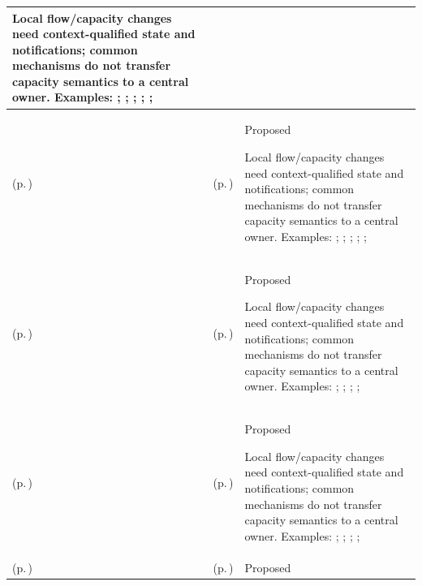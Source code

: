 \begin{longtable}{|>{\raggedright\arraybackslash}p{0.27\TableWidth}|>{\raggedright\arraybackslash}p{0.27\TableWidth}|>{\raggedright\arraybackslash}p{0.46\TableWidth}|}
Local flow/capacity changes need context-qualified state and notifications; common mechanisms do not transfer capacity semantics to a central owner. Examples: \nameref{feature:feat-hso-05}; \nameref{feature:feat-hso-06}; \nameref{function:manage-theatre-capacity}; \nameref{function:manage-theatre-case-progression}; \nameref{service:theatre-case-progression-telemetry}; \nameref{feature:theatre-session-capacity-management}\\\hline
\nameref{cap:bec-theatre-operations} (p.\,\pageref{cap:bec-theatre-operations}) & \nameref{cap:ec-09} (p.\,\pageref{cap:ec-09}) & Proposed

Local flow/capacity changes need context-qualified state and notifications; common mechanisms do not transfer capacity semantics to a central owner. Examples: \nameref{feature:feat-hso-05}; \nameref{feature:feat-hso-06}; \nameref{function:manage-theatre-capacity}; \nameref{function:manage-theatre-case-progression}; \nameref{service:theatre-case-progression-telemetry}; \nameref{feature:theatre-session-capacity-management}\\\hline
\nameref{cap:bec-emergency-department-operations} (p.\,\pageref{cap:bec-emergency-department-operations}) & \nameref{cap:ec-02} (p.\,\pageref{cap:ec-02}) & Proposed

Local flow/capacity changes need context-qualified state and notifications; common mechanisms do not transfer capacity semantics to a central owner. Examples: \nameref{feature:feat-hso-07}; \nameref{feature:feat-hso-08}; \nameref{function:coordinate-ed-departmental-capacity}; \nameref{service:ed-operational-status-query}; \nameref{feature:emergency-treatment-capacity-management}\\\hline
\nameref{cap:bec-emergency-department-operations} (p.\,\pageref{cap:bec-emergency-department-operations}) & \nameref{cap:ec-03} (p.\,\pageref{cap:ec-03}) & Proposed

Local flow/capacity changes need context-qualified state and notifications; common mechanisms do not transfer capacity semantics to a central owner. Examples: \nameref{feature:feat-hso-07}; \nameref{feature:feat-hso-08}; \nameref{function:coordinate-ed-departmental-capacity}; \nameref{service:ed-operational-status-query}; \nameref{feature:emergency-treatment-capacity-management}\\\hline
\nameref{cap:bec-emergency-department-operations} (p.\,\pageref{cap:bec-emergency-department-operations}) & \nameref{cap:ec-09} (p.\,\pageref{cap:ec-09}) & Proposed


\end{longtable}
